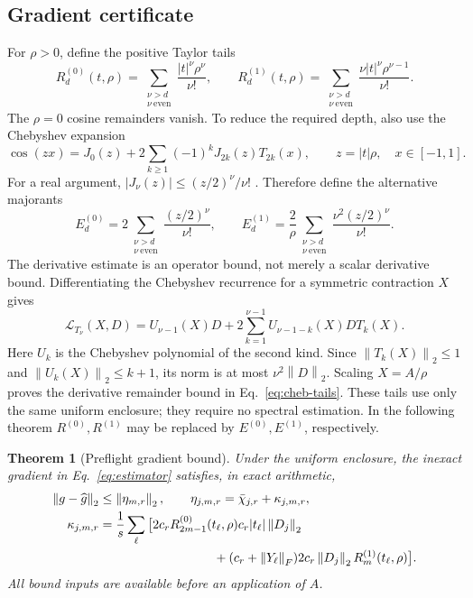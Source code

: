 \documentclass[10pt,letterpaper,twoside]{article}
\newcommand{\norm}[1]{\left\lVert #1\right\rVert}
\newcommand{\Lfrechet}{\mathcal{L}}
\newcommand{\ghat}{\widehat g}
\newtheorem{theorem}{Theorem}
\begin{document}
\subsection{Gradient certificate}
For $\rho>0$, define the positive Taylor tails
\begin{equation}
 R_d^{(0)}(t,\rho)=\sum_{\substack{\nu>d\\\nu\ \mathrm{even}}}\frac{|t|^\nu\rho^\nu}{\nu!},\qquad
 R_d^{(1)}(t,\rho)=\sum_{\substack{\nu>d\\\nu\ \mathrm{even}}}\frac{\nu|t|^\nu\rho^{\nu-1}}{\nu!}.
 \label{eq:tails}
\end{equation}
The $\rho=0$ cosine remainders vanish.
To reduce the required depth, also use the Chebyshev expansion
\begin{equation}
 \cos(zx)=J_0(z)+2\sum_{k\ge1}(-1)^kJ_{2k}(z)T_{2k}(x),
 \qquad z=|t|\rho,\quad x\in[-1,1].
\end{equation}
For a real argument, $|J_\nu(z)|\le(z/2)^\nu/\nu!$
\cite{dlmf}. Therefore define the alternative majorants
\begin{equation}
 E_d^{(0)}=2\sum_{\substack{\nu>d\\\nu\ \mathrm{even}}}
 \frac{(z/2)^\nu}{\nu!},\qquad
 E_d^{(1)}=\frac2\rho\sum_{\substack{\nu>d\\\nu\ \mathrm{even}}}
 \frac{\nu^2(z/2)^\nu}{\nu!}.
 \label{eq:cheb-tails}
\end{equation}
The derivative estimate is an operator bound, not merely a scalar derivative
bound. Differentiating the Chebyshev recurrence for a symmetric contraction $X$
gives
\begin{equation}
 \Lfrechet_{T_\nu}(X,D)=U_{\nu-1}(X)D+
 2\sum_{k=1}^{\nu-1}U_{\nu-1-k}(X)D T_k(X).
\end{equation}
Here $U_k$ is the Chebyshev polynomial of the second kind.
Since $\norm{T_k(X)}_2\le1$ and $\norm{U_k(X)}_2\le k+1$, its norm is at
most $\nu^2\norm D_2$. Scaling $X=A/\rho$ proves the derivative remainder
bound in Eq.~\eqref{eq:cheb-tails}. These tails use only the same uniform
enclosure; they require no spectral estimation. In the following theorem
$R^{(0)},R^{(1)}$ may be replaced by $E^{(0)},E^{(1)}$, respectively.
\begin{theorem}[Preflight gradient bound]
Under the uniform enclosure, the inexact gradient in Eq.~\eqref{eq:estimator}
satisfies, in exact arithmetic,
\begin{align}
 \norm{g-\ghat}_2&\le\norm{\eta_{m,r}}_2,\qquad \eta_{j,m,r}=\bar\chi_{j,r}+\kappa_{j,m,r},\\
 \kappa_{j,m,r}&=\frac1s\sum_\ell\big[
 2c_rR_{2m-1}^{(0)}(t_\ell,\rho)c_r|t_\ell|\norm{D_j}_2\notag\\
 &\hspace{32mm}+(c_r+\norm{Y_\ell}_F)2c_r\norm{D_j}_2R_m^{(1)}(t_\ell,\rho)\big].
 \label{eq:certificate}
\end{align}
All bound inputs are available before an application of $A$.
\end{theorem}
\end{document}

